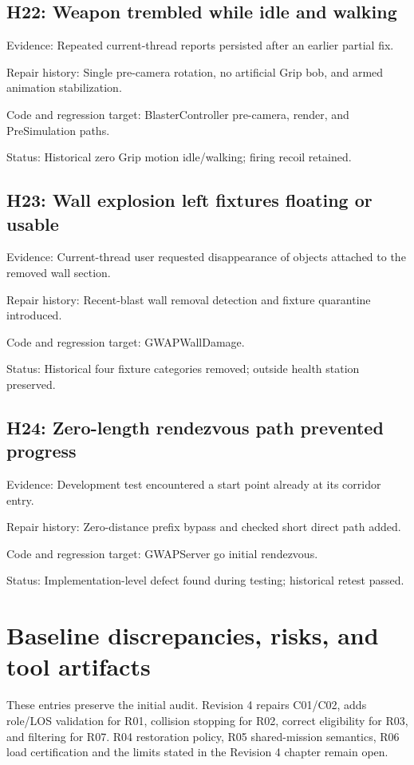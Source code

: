 \subsection{H22: Weapon trembled while idle and walking}
Evidence: Repeated current-thread reports persisted after an earlier partial fix.\allowbreak{}

Repair history: Single pre-camera rotation, no artificial Grip bob, and armed animation stabilization.\allowbreak{}

Code and regression target: BlasterController pre-camera, render, and PreSimulation paths.\allowbreak{}

Status: Historical zero Grip motion idle/\allowbreak{}walking; firing recoil retained.\allowbreak{}

\subsection{H23: Wall explosion left fixtures floating or usable}
Evidence: Current-thread user requested disappearance of objects attached to the removed wall section.\allowbreak{}

Repair history: Recent-blast wall removal detection and fixture quarantine introduced.\allowbreak{}

Code and regression target: GWAPWallDamage.\allowbreak{}

Status: Historical four fixture categories removed; outside health station preserved.\allowbreak{}

\subsection{H24: Zero-length rendezvous path prevented progress}
Evidence: Development test encountered a start point already at its corridor entry.\allowbreak{}

Repair history: Zero-distance prefix bypass and checked short direct path added.\allowbreak{}

Code and regression target: GWAPServer go initial rendezvous.\allowbreak{}

Status: Implementation-level defect found during testing; historical retest passed.\allowbreak{}

\section{Baseline discrepancies, risks, and tool artifacts}
These entries preserve the initial audit.\allowbreak{} Revision 4 repairs C01/\allowbreak{}C02, adds role/\allowbreak{}LOS validation for R01, collision stopping for R02, correct eligibility for R03, and filtering for R07.\allowbreak{} R04 restoration policy, R05 shared-mission semantics, R06 load certification and the limits stated in the Revision 4 chapter remain open.\allowbreak{}

